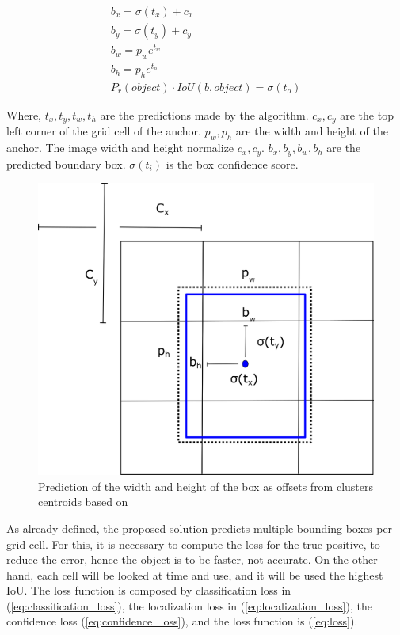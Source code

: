     
    \begin{equation}
    \label{eq:bound}
    \begin{aligned}
        b_x = \sigma(t_x) + c_x \\
        b_y = \sigma(t_y) + c_y \\
        b_w = p_we^{t_w} \\
        b_h = p_he^{t_h} \\
        P_r(object)\cdot IoU(b,object) = \sigma(t_o)
    \end{aligned}
    \end{equation}

Where, $t_x, t_y, t_w, t_h$ are the predictions made by the algorithm. 
$c_x, c_y$ are the top left corner of the grid cell of the anchor.
$p_w, p_h$ are the width and height of the anchor. 
The image width and height normalize $ c_x, c_y$. 
$b_x, b_y, b_w, b_h$ are the predicted boundary box. 
$\sigma(t_i)$ is the box confidence score.

\begin{figure}[H]
\centering
\includegraphics[scale=0.5]{imagens/anchor.png}
\caption{Prediction of the width and height of the box as offsets from clusters centroids based on \cite{redmon2017yolo9000}}
\label{fig:anchor}
\end{figure}

As already defined, the proposed solution predicts multiple bounding boxes per grid cell. For this, it is necessary to compute the loss for the true positive, to reduce the error, hence the object is to be faster, not accurate. On the other hand, each cell will be looked at time and use, and it will be used the highest IoU. The loss function is composed by classification loss in (\ref{eq:classification_loss}), the localization loss in (\ref{eq:localization_loss}), the confidence loss (\ref{eq:confidence_loss}), and the loss function is (\ref{eq:loss}). 

